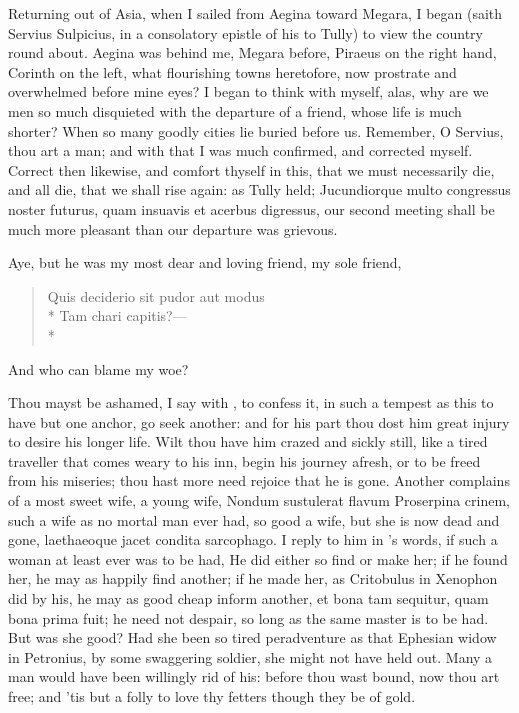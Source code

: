 {Returning out of Asia, when I sailed from Aegina toward Megara, I
began (saith Servius Sulpicius, in a consolatory epistle of his to
Tully) to view the country round about. Aegina was behind me, Megara
before, Piraeus on the right hand, Corinth on the left, what
flourishing towns heretofore, now prostrate and overwhelmed before mine
eyes? I began to think with myself, alas, why are we men so much
disquieted with the departure of a friend, whose life is much shorter?
When so many goodly cities lie buried before us. Remember, O
Servius, thou art a man; and with that I was much confirmed, and
corrected myself. Correct then likewise, and comfort thyself in this,
that we must necessarily die, and all die, that we shall rise again: as
Tully held; Jucundiorque multo congressus noster futurus, quam insuavis
et acerbus digressus, our second meeting shall be much more pleasant
than our departure was grievous.

Aye, but he was my most dear and loving friend, my sole friend,
%
\begin{latin}%
\begin{verse}%
Quis deciderio sit pudor aut modus\\*
Tam chari capitis?---\\*
\end{verse}%
\end{latin}%
%
And who can blame my woe?

Thou mayst be ashamed, I say with \Seneca, to confess it, in such
a tempest as this to have but one anchor, go seek another: and
for his part thou dost him great injury to desire his longer life.
Wilt thou have him crazed and sickly still, like a tired
traveller that comes weary to his inn, begin his journey afresh, or to
be freed from his miseries; thou hast more need rejoice that he is
gone. Another complains of a most sweet wife, a young wife, Nondum
sustulerat flavum Proserpina crinem, such a wife as no mortal man ever
had, so good a wife, but she is now dead and gone, laethaeoque jacet
condita sarcophago. I reply to him in \Seneca's words, if such a woman
at least ever was to be had, He did either so find or make her;
if he found her, he may as happily find another; if he made her, as
Critobulus in Xenophon did by his, he may as good cheap inform another,
et bona tam sequitur, quam bona prima fuit; he need not despair, so
long as the same master is to be had. But was she good? Had she been so
tired peradventure as that Ephesian widow in Petronius, by some
swaggering soldier, she might not have held out. Many a man would have
been willingly rid of his: before thou wast bound, now thou art free;
and 'tis but a folly to love thy fetters though they be of gold.

}
